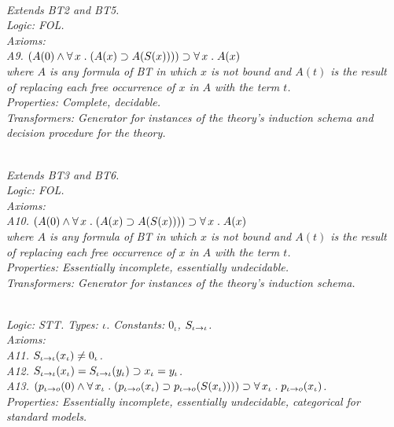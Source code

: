 \documentclass[fleqn]{llncs}
\begin{document}
\begin{biformthy}\em\ \\
Extends BT2 and BT5.\\
\emph{Logic}: FOL.\\
\emph{Axioms}:\\
\indent A9. $(A(0) \wedge \forall\, x \mathrel. (A(x) \supset A(S(x))))
\supset \forall\, x \mathrel. A(x)$\\
\indent 
where $A$ is any formula of BT{\thebiformthy} in which $x$ is not bound and $A(t)$ 
is the result\\
\indent
of replacing each free occurrence of $x$ in $A$ with the term $t$.\\
\emph{Properties}: Complete, decidable.\\
\emph{Transformers}: Generator for instances of the theory's induction schema 
and decision procedure for the theory.
\end{biformthy}

\begin{biformthy}\em\ \\
Extends BT3 and BT6.\\ 
\emph{Logic}: FOL.\\
\emph{Axioms}:\\
\indent A10. $(A(0) \wedge \forall\, x \mathrel. (A(x) \supset A(S(x))))
\supset \forall\, x \mathrel. A(x)$\\
\indent 
where $A$ is any formula of BT{\thebiformthy} in which $x$ is not bound and $A(t)$
is the result\\
\indent
of replacing each free occurrence of $x$ in $A$ with the term $t$.\\
\emph{Properties}: Essentially incomplete, essentially undecidable.\\
\emph{Transformers}: Generator for instances of the theory's induction schema.
\end{biformthy}

\begin{biformthy}\em\ \\
\emph{Logic}: STT. \emph{Types}: $\iota$. 
\emph{Constants}: $0_\iota$, $S_{\iota \rightarrow \iota}$.\\
\emph{Axioms}:\\
\indent A11. $S_{\iota \rightarrow \iota}(x_\iota) \not= 0_\iota$.\\
\indent A12. $S_{\iota \rightarrow \iota}(x_\iota) = S_{\iota \rightarrow \iota}(y_\iota) 
\supset x_\iota = y_\iota$.\\
\indent A13. $(p_{\iota \rightarrow o}(0) \wedge 
\forall\, x_\iota \mathrel. (p_{\iota \rightarrow o}(x_\iota) 
\supset p_{\iota \rightarrow o}(S(x_\iota)))) 
\supset \forall\, x_\iota \mathrel. p_{\iota \rightarrow o}(x_\iota)$.\\
\emph{Properties}: Essentially incomplete, essentially undecidable, categorical for standard models.
\end{biformthy}
\end{document}
